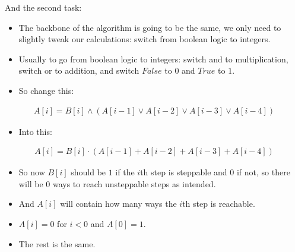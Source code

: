 And the second task:

\begin{itemize}
    \item The backbone of the algorithm is going to be the same, we only need to slightly tweak our  calculations: switch from boolean logic to integers.
    \item Usually to go from boolean logic to integers: switch and to multiplication, switch or to addition, and switch $False$ to $0$ and $True$ to $1$.
    \item So change this:
\end{itemize}

\begin{align*}
A[i] = B[i]\land{}(A[i-1] \lor{} A[i-2] \lor{} A[i-3] \lor{} A[i-4])
\end{align*}

\begin{itemize}
    \item Into this:
\end{itemize}

\begin{align*}
A[i] = B[i]\cdot{}(A[i-1] + A[i-2] + A[i-3] + A[i-4])
\end{align*}

\begin{itemize}
    \item So now $B[i]$ should be $1$ if the $i$th step is steppable and $0$ if not, so there will be $0$ ways to reach unsteppable steps as intended.
    \item And $A[i]$ will contain how many ways the $i$th step is reachable.
    \item $A[i] = 0$ for $i<0$ and $A[0] = 1$.
    \item The rest is the same.
\end{itemize}